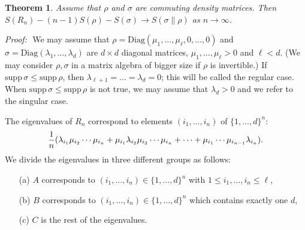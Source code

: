 \documentclass[12pt,a4paper]{article}
\newtheorem{thm}{Theorem}
\def\supp{\mathrm{supp}\,}
\def\proof{{\it Proof:}\,\,}
\def\Diag{\mathrm{Diag}}
\begin{document}
\begin{thm} \label{T:2}
Assume that $\rho$ and $\sigma$ are commuting density matrices. Then
$S(R_n) -(n-1)S(\rho)-S(\sigma)\to S(\sigma \| \rho)$ as $n \to \infty$.
\end{thm}

\proof
We may assume that $\rho=\Diag(\mu_1,\dots,\mu_\ell, 0,\dots,0)$ and
$\sigma=\Diag(\lambda_1,\dots,\lambda_d)$ are $d \times d$ diagonal matrices,
$\mu_1, \dots, \mu_\ell >0$ and $\ell < d$. (We may consider
$\rho,\sigma$ in a matrix algebra of bigger size if $\rho$ is invertible.) 
If $\supp \sigma \le \supp \rho$, then $\lambda_{\ell+1}= \dots =\lambda_d=0$;
this will be called the regular case. When $\supp \sigma \le \supp \rho$ is not true,
we may assume that $\lambda_d>0$ and we refer to the singular case.

The eigenvalues of $R_n$ correspond to elements $(i_1,\dots ,i_n)$ of
$\{1,\dots,d\}^n$:
\begin{equation}\label{ev}
{1\over n}(\lambda_{i_1}\mu_{i_2}\cdots\mu_{i_n}
+\mu_{i_1}\lambda_{i_2}\mu_{i_3}\cdots\mu_{i_n}
+\dots+\mu_{i_1}\cdots\mu_{i_{n-1}}\lambda_{i_n}). \end{equation}
We divide the eigenvalues in three different groups as follows:
\begin{itemize}
\item[(a)] $A$ corresponds to $(i_1,\dots ,i_n)\in\{1,\dots,d\}^n$ with
$1 \le i_1,\dots ,i_n \le \ell$,
\item[(b)] $B$ corresponds to $(i_1,\dots ,i_n)\in\{1,\dots,d\}^n$ which contains
exactly one $d$,
\item[(c)] $C$ is the rest of the eigenvalues. \end{itemize}
\end{document}
